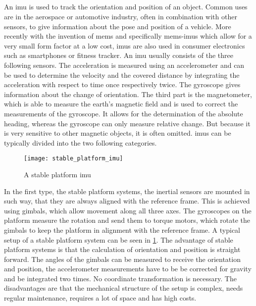 \subsection{}
An \gls{imu} is used to track the orientation and position of an object.
Common uses are in the aerospace or automotive industry, often in combination with other sensors, to give information about the pose and position of a vehicle.
More recently with the invention of \gls{mems} and specifically \gls{mems}-\gls{imu}s which allow for a very small form factor at a low cost, \gls{imu}s are also used in consumer electronics such as smartphones or fitness tracker.
An \gls{imu} usually consists of the three following sensors.
The acceleration is measured using an accelerometer and can be used to determine the velocity and the covered distance by integrating the acceleration with respect to time once respectively twice.
The gyroscope gives information about the change of orientation.
The third part is the magnetometer, which is able to measure the earth's magnetic field and is used to correct the measurements of the gyroscope.
It allows for the determination of the absolute heading, whereas the gyroscope can only measure relative change. But because it is very sensitive to other magnetic objects, it is often omitted.
\gls{imu}s can be typically divided into the two following categories.\\
\begin{figure}[htbp]
	\centering
	\texttt{[image: stable\_platform\_imu]}
	\caption{A stable platform \acrshort{imu} \cite{Woodman2007}}
	\label{fig:stable_platform_imu}
\end{figure}
In the first type, the stable platform systems, the inertial sensors are mounted in such way, that they are always aligned with the reference frame.
This is achieved using gimbals, which allow movement along all three axes.
The gyroscopes on the platform measure the rotation and send them to torque motors, which rotate the gimbals to keep the platform in alignment with the reference frame.
A typical setup of a stable platform system can be seen in \cref{fig:stable_platform_imu}.
The advantage of stable platform systems is that the calculation of orientation and position is straight forward.
The angles of the gimbals can be measured to receive the orientation and position, the accelerometer measurements have to be be corrected for gravity and be integrated two times.
No coordinate transformation is necessary.
The disadvantages are that the mechanical structure of the setup is complex, needs regular maintenance, requires a lot of space and has high costs.\\

